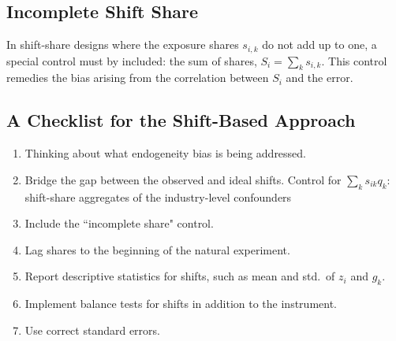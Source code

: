 \subsection{Incomplete Shift Share}
\label{sec:ssiv_incomplete_share}
In shift-share designs where the exposure shares $s_{i,k}$ do not add up to one,
a special control must by included: the sum of shares, $S_i = \sum_{k} s_{i,k}$.
This control remedies the bias arising from the correlation between $S_i$ and the error.

\subsection{A Checklist for the Shift-Based Approach}
\begin{enumerate}
    \item Thinking about what endogeneity bias is being addressed.
    \item Bridge the gap between the observed and ideal shifts. 
    Control for $\sum_{k} s_{ik} q_k$: shift-share aggregates of the industry-level confounders
    \item Include the ``incomplete share" control.
    \item Lag shares to the beginning of the natural experiment.
    \item Report descriptive statistics for shifts, such as mean and std.~of $z_i$ and $g_k$.
    \item Implement balance tests for shifts in addition to the instrument.
    \item Use correct standard errors.
\end{enumerate}